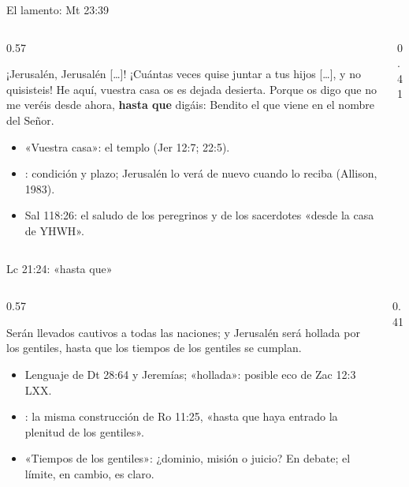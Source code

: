 \begin{frame}{El lamento: Mt 23:39}
\begin{columns}[c,onlytextwidth]
\begin{column}{0.57\textwidth}
\begin{cita}¡Jerusalén, Jerusalén [\ldots]! ¡Cuántas veces quise juntar a tus hijos [\ldots], y no quisisteis! He aquí, vuestra casa os es dejada desierta. Porque os digo que no me veréis desde ahora, \textbf{hasta que} digáis: Bendito el que viene en el nombre del Señor.\end{cita}
\scriptsize
\begin{itemize}
\item «Vuestra casa»: el templo (Jer 12:7; 22:5).
\item {}: condición y plazo; Jerusalén lo verá de nuevo cuando lo reciba (Allison, 1983).
\item Sal 118:26: el saludo de los peregrinos y de los sacerdotes «desde la casa de YHWH».
\end{itemize}
\end{column}
\begin{column}{0.41\textwidth}\end{column}
\end{columns}
\end{frame}

\begin{frame}{Lc 21:24: «hasta que»}
\begin{columns}[c,onlytextwidth]
\begin{column}{0.57\textwidth}
\begin{cita}Serán llevados cautivos a todas las naciones; y Jerusalén será hollada por los gentiles, hasta que los tiempos de los gentiles se cumplan.\end{cita}
\scriptsize
\begin{itemize}
\item Lenguaje de Dt 28:64 y Jeremías; «hollada»: posible eco de Zac 12:3 LXX.
\item {}: la misma construcción de Ro 11:25, «hasta que haya entrado la plenitud de los gentiles».
\item «Tiempos de los gentiles»: ¿dominio, misión o juicio? En debate; el límite, en cambio, es claro.
\end{itemize}
\end{column}
\begin{column}{0.41\textwidth}\end{column}
\end{columns}
\end{frame}

